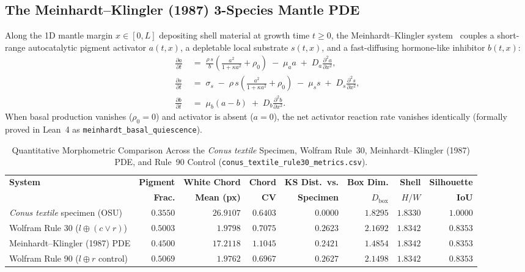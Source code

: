 \documentclass[11pt,a4paper]{article}
\theoremstyle{definition}
\theoremstyle{remark}
\begin{document}
\subsection{The Meinhardt--Klingler (1987) 3-Species Mantle PDE}

Along the 1D mantle margin $x \in [0, L]$ depositing shell material at growth time $t \ge 0$, the Meinhardt--Klingler system~\cite{MeinhardtKlingler1987} couples a short-range autocatalytic pigment activator $a(t,x)$, a depletable local substrate $s(t,x)$, and a fast-diffusing hormone-like inhibitor $b(t,x)$:
\begin{align}
  \frac{\partial a}{\partial t} &\;=\; \frac{\rho\,s}{b}\!\left(\frac{a^2}{1 + \kappa a^2} + \rho_0\right) \;-\; \mu_a a \;+\; D_a \frac{\partial^2 a}{\partial x^2},\label{eq:mein_a}\\
  \frac{\partial s}{\partial t} &\;=\; \sigma_s \;-\; \rho\,s\!\left(\frac{a^2}{1 + \kappa a^2} + \rho_0\right) \;-\; \mu_s s \;+\; D_s \frac{\partial^2 s}{\partial x^2},\label{eq:mein_s}\\
  \frac{\partial b}{\partial t} &\;=\; \mu_b(a - b) \;+\; D_b \frac{\partial^2 b}{\partial x^2}.\label{eq:mein_b}
\end{align}
When basal production vanishes ($\rho_0 = 0$) and activator is absent ($a = 0$), the net activator reaction rate vanishes identically (formally proved in Lean~4 as \texttt{meinhardt\_basal\_quiescence}).

\begin{table}[htbp]
\centering
\caption{Quantitative Morphometric Comparison Across the \emph{Conus textile} Specimen, Wolfram Rule~30, Meinhardt--Klingler (1987) PDE, and Rule~90 Control (\texttt{conus\_textile\_rule30\_metrics.csv}).}
\label{tab:morphometrics}
\footnotesize
\begin{tabular}{@{}lrrrrrrr@{}}
\toprule
\textbf{System} & \textbf{Pigment} & \textbf{White Chord} & \textbf{Chord} & \textbf{KS Dist.\ vs.} & \textbf{Box Dim.} & \textbf{Shell} & \textbf{Silhouette} \\
 & \textbf{Frac.} & \textbf{Mean (px)} & \textbf{CV} & \textbf{Specimen} & $D_{\mathrm{box}}$ & $H/W$ & \textbf{IoU} \\
\midrule
\emph{Conus textile} specimen (OSU) & $0.3550$ & $26.9107$ & $0.6403$ & $0.0000$ & $1.8295$ & $1.8330$ & $1.0000$ \\
Wolfram Rule 30 ($l \oplus (c \lor r)$) & $0.5003$ & $1.9798$ & $0.7075$ & $0.2623$ & $2.1692$ & $1.8342$ & $0.8353$ \\
Meinhardt--Klingler (1987) PDE & $0.4500$ & $17.2118$ & $1.1045$ & $0.2421$ & $1.4854$ & $1.8342$ & $0.8353$ \\
Wolfram Rule 90 ($l \oplus r$ control) & $0.5069$ & $1.9762$ & $0.6967$ & $0.2627$ & $2.1498$ & $1.8342$ & $0.8353$ \\
\bottomrule
\end{tabular}
\end{table}
\end{document}

